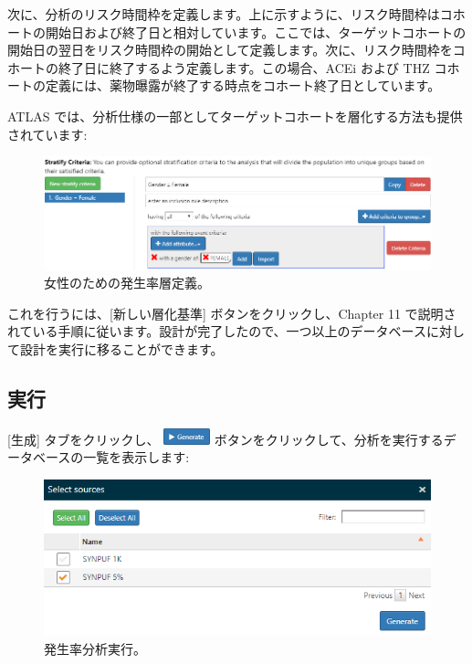 \documentclass[
  11pt]{book}
\theoremstyle{definition}
\theoremstyle{definition}
\theoremstyle{definition}
\theoremstyle{definition}
\theoremstyle{remark}
\begin{document}
次に、分析のリスク時間枠を定義します。上に示すように、リスク時間枠はコホートの開始日および終了日と相対しています。ここでは、ターゲットコホートの開始日の翌日をリスク時間枠の開始として定義します。次に、リスク時間枠をコホートの終了日に終了するよう定義します。この場合、ACEi および THZ コホートの定義には、薬物曝露が終了する時点をコホート終了日としています。

ATLAS では、分析仕様の一部としてターゲットコホートを層化する方法も提供されています:

\begin{figure}

{\centering \includegraphics[width=1\linewidth]{images/Characterization/atlasIncidenceStratifyFemale} 

}

\caption{女性のための発生率層定義。}\label{fig:atlasIncidenceStratifyFemale}
\end{figure}

これを行うには、{[}新しい層化基準{]} ボタンをクリックし、Chapter 11 で説明されている手順に従います。設計が完了したので、一つ以上のデータベースに対して設計を実行に移ることができます。

\subsection{実行}\label{ux5b9fux884c-2}

{[}生成{]} タブをクリックし、 \includegraphics{images/Characterization/atlasIncidenceGenerate.png} ボタンをクリックして、分析を実行するデータベースの一覧を表示します:

\begin{figure}

{\centering \includegraphics[width=1\linewidth]{images/Characterization/atlasIncidenceSourceSelection} 

}

\caption{発生率分析実行。}\label{fig:atlasIncidenceSourceSelection}
\end{figure}
\end{document}
